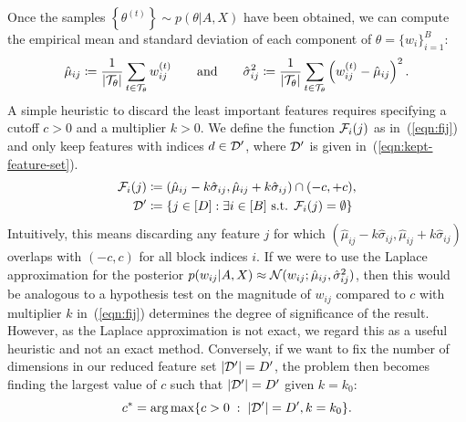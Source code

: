 Once the samples $\left\{ \theta^{(t)} \right\} \sim p(\theta | A, X)$
have been obtained, we can compute the empirical mean and standard deviation of each component of $\theta = \{ w_i \}_{i=1}^{B}$:
%
\begin{equation}
	\hat{\mu}_{ij} \coloneqq \frac{1}{|\mathcal{T}_\theta|} \sum_{t \in \mathcal{T}_\theta} w_{ij}^{(t)} \qquad \textrm{and} \qquad
	\hat{\sigma}_{ij}^2 \coloneqq \frac{1}{|\mathcal{T}_\theta|} \sum_{t \in \mathcal{T}_\theta} \left( w_{ij}^{(t)} - \hat{\mu}_{ij} \right)^2.
\end{equation}
%
A simple heuristic to discard the least important features requires specifying a cutoff $c > 0$ and a multiplier $k > 0$. We define the function $\mathcal{F}_i(j)$ 
as in~(\ref{eqn:fij}) and only keep features with indices $d \in \mathcal{D}'$, where $\mathcal{D}'$ is given in~(\ref{eqn:kept-feature-set}).
%
\begin{align}
	\mathcal{F}_i(j) &\coloneqq (\hat{\mu}_{ij} - k \hat{\sigma}_{ij}, \hat{\mu}_{ij} + k \hat{\sigma}_{ij}) \cap (-c, +c),
	\label{eqn:fij} \\
	\mathcal{D}' &\coloneqq \left\{ j \in [D] : \exists i \in [B] \textrm{ s.t. }  \mathcal{F}_i(j) = \emptyset \right\}
	\label{eqn:kept-feature-set}
\end{align}
%
Intuitively, this means discarding any feature $j$ for which 
$(\hat{\mu}_{ij} - k\hat{\sigma}_{ij}, \hat{\mu}_{ij} + k \hat{\sigma}_{ij})$ overlaps with
$(-c, c)$ for all block indices $i$. If we were to use the Laplace approximation for the posterior $p(w_{ij} | A, X) \approx \mathcal{N}(w_{ij}; \hat{\mu}_{ij}, \hat{\sigma}_{ij}^2)$, then this would be analogous to a hypothesis test on the magnitude of $w_{ij}$ compared to $c$ with multiplier $k$ in~(\ref{eqn:fij}) determines the degree of significance of the result. However, as the Laplace approximation is not exact, we regard this as a useful heuristic and not an exact method. Conversely, if we want to fix the number of dimensions in our reduced feature set $|\mathcal{D}'|=D'$, the problem then becomes finding the largest value of $c$ such that $|\mathcal{D}'|=D'$ given $k=k_0$:
%
\begin{equation}
	c^* = \operatorname*{arg\,max} \{c>0\; : \;|\mathcal{D}'| = D', k=k_0\}.
	\label{eqn:c-star}
\end{equation}

